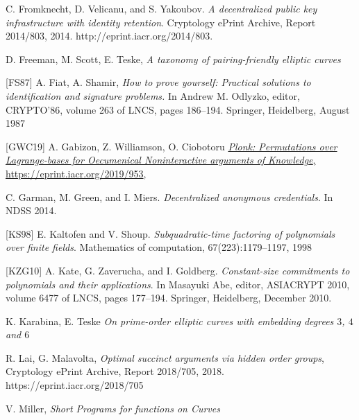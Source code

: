 \documentclass[11pt, lettersize, notitlepage, leqno, footskip=0.6cm]{article}
\newcommand{\noin}{\noindent}
\numberwithin{equation}{section}
\begin{document}
\noin [FVY14] C. Fromknecht, D. Velicanu, and S. Yakoubov. \textit{A decentralized public key infrastructure with identity retention}. Cryptology ePrint Archive, Report 2014/803, 2014. http://eprint.iacr.org/2014/803. \vspace{1mm}

\noin [FST06] D. Freeman, M. Scott, E. Teske, \textit{A taxonomy of pairing-friendly elliptic curves}\vspace{1mm}

\noin \hypertarget{FS}{[FS87]} A. Fiat, A. Shamir, \textit{How to prove yourself: Practical solutions to identification and signature problems.} In Andrew M. Odlyzko, editor, CRYPTO’86, volume 263 of LNCS, pages 186–194. Springer, Heidelberg, August 1987 \vspace{1mm}

\noin \hypertarget{Plonk}{[GWC19]} A. Gabizon, Z. Williamson, O. Ciobotoru \href{https://eprint.iacr.org/2019/953}{\textit{Plonk: Permutations over Lagrange-bases for Oecumenical Noninteractive arguments of Knowledge}, https://eprint.iacr.org/2019/953}, \vspace{1mm}

\noin [GGM14] C. Garman, M. Green, and I. Miers. \textit{Decentralized anonymous credentials}. In NDSS 2014. \vspace{1mm}

\noin \hypertarget{KS98}{[KS98]} E. Kaltofen and V. Shoup. \textit{Subquadratic-time factoring of polynomials over finite fields}. Mathematics of computation, 67(223):1179–1197, 1998 \vspace{1mm}

\noin \hypertarget{KZG}{[KZG10]} A. Kate, G. Zaverucha, and I. Goldberg. \textit{Constant-size commitments to polynomials and their applications}. In Masayuki Abe, editor, ASIACRYPT 2010, volume 6477 of LNCS, pages 177–194. Springer, Heidelberg, December 2010. \vspace{1mm}

\noin [KT07] K. Karabina, E. Teske \textit{On prime-order elliptic curves with embedding degrees $3$, $4$ and $6$} \vspace{1mm}

\noin [LM18] R. Lai, G. Malavolta, \textit{Optimal succinct arguments via hidden order groups}, Cryptology ePrint Archive, Report 2018/705, 2018. https://eprint.iacr.org/2018/705 \vspace{1mm}

\noin [Mil86] V. Miller, \textit{Short Programs for functions on Curves}\vspace{1mm}
\end{document}
